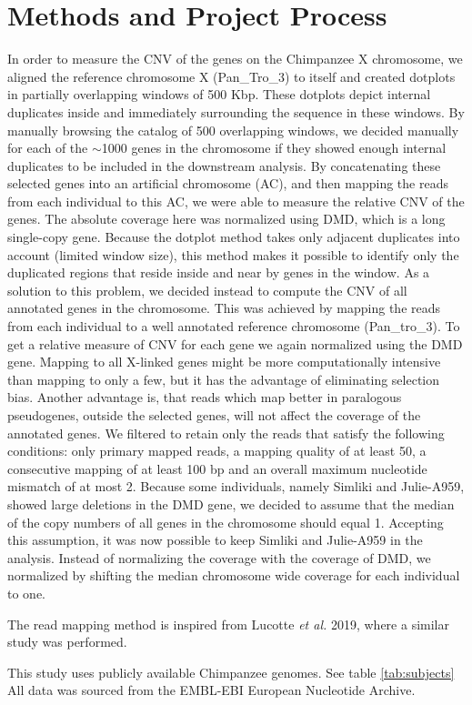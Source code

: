 \section*{Methods and Project Process}
In order to measure the CNV of the genes on the Chimpanzee X chromosome, we aligned the reference chromosome X (Pan\_Tro\_3) to itself and created dotplots in partially overlapping windows of 500 Kbp. These dotplots depict internal duplicates inside and immediately surrounding the sequence in these windows. By manually browsing the catalog of 500 overlapping windows, we decided manually for each of the $\sim$1000 genes in the chromosome if they showed enough internal duplicates to be included in the downstream analysis. By concatenating these selected genes into an artificial chromosome (AC), and then mapping the reads from each individual to this AC, we were able to measure the relative CNV of the genes. The absolute coverage here was normalized using DMD, which is a long single-copy gene. Because the dotplot method takes only adjacent duplicates into account (limited window size), this method makes it possible to identify only the duplicated regions that reside inside and near by genes in the window. As a solution to this problem, we decided instead to  compute the CNV of all annotated genes in the chromosome. This was achieved by mapping the reads from each individual to a well annotated reference chromosome (Pan\_tro\_3). To get a relative measure of CNV for each gene we again normalized using the DMD gene. Mapping to all X-linked genes might be more computationally intensive than mapping to only a few, but it has the advantage of eliminating selection bias. Another advantage is, that reads which map better in paralogous pseudogenes, outside the selected genes, will not affect the coverage of the annotated genes. We filtered to retain only the reads that satisfy the following conditions: only primary mapped reads, a mapping quality of at least 50, a consecutive mapping of at least 100 bp and an overall maximum nucleotide mismatch of at most 2. Because some individuals, namely Simliki and Julie-A959, showed large deletions in the DMD gene, we decided to assume that the median of the copy numbers of all genes in the chromosome should equal 1. Accepting this assumption, it was now possible to keep Simliki and Julie-A959 in the analysis. Instead of normalizing the coverage with the coverage of DMD, we normalized by shifting the median chromosome wide coverage for each individual to one.

The read mapping method is inspired from Lucotte \textit{et al.} 2019\cite{Lucotte907}, where a similar study was performed.

This study uses publicly available Chimpanzee genomes. See table \ref{tab:subjects} All data was sourced from the EMBL-EBI European Nucleotide Archive.